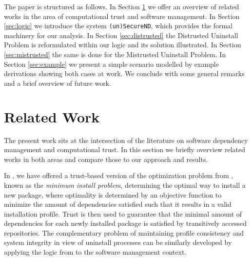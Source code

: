 \documentclass[]{llncs}
\begin{document}
The paper is structured as follows. In Section \ref{sec:related} we offer an overview of related works in the area of computational trust and software management. In Section \ref{sec:logic} we introduce the system \texttt{(un)SecureND}, which provides the formal machinery for our analysis. In Section \ref{sec:distrusted} the Distrusted Uninstall Problem is reformulated within our logic and its solution illustrated. In Section \ref{sec:mistrusted} the same is done for the Mistrusted Uninstall Problem. In Section \ref{sec:example} we present a simple scenario modelled by example derivations showing both cases at work. We conclude with some general remarks and a brief overview of future work.


\section{Related Work}\label{sec:related}

The present work sits at the intersection of the literature on software dependency management and computational trust. In this section we briefly overview related works in both areas and compare those to our approach and results.

In \cite{DBLP:conf/pst/BoenderPR15}, we have offered a trust-based version of the optimization problem from  \cite{4222580}, known as the \textit{minimum install problem}, determining the optimal way to install a new package, where optimality is determined by an objective function to minimize the amount of dependencies satisfied such that it results in a valid installation profile. Trust is then used to guarantee that the minimal amount of dependencies  for each newly installed package is satisfied by transitively accessed repositories. The complementary problem of maintaining profile consistency and system integrity in view of uninstall processes can be similarly developed by applying the logic from \cite{DBLP:conf/ifiptm/Primiero16} to the software management context.
\end{document}
